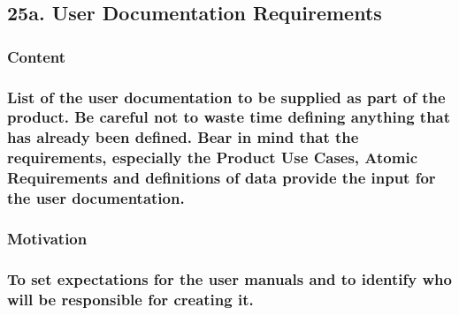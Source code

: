 \documentclass[
]{article}
\begin{document}
\hypertarget{a.-user-documentation-requirements}{%
\subsection{\texorpdfstring{25a. User Documentation Requirements
}{25a. User Documentation Requirements }}\label{a.-user-documentation-requirements}}

\hypertarget{content-74}{%
\subsubsection{Content}\label{content-74}}

\hypertarget{list-of-the-user-documentation-to-be-supplied-as-part-of-the-product.-be-careful-not-to-waste-time-defining-anything-that-has-already-been-defined.-bear-in-mind-that-the-requirements-especially-the-product-use-cases-atomic-requirements-and-definitions-of-data-provide-the-input-for-the-user-documentation.}{%
\subsubsection{\texorpdfstring{List of the user documentation to be
supplied as part of the product. Be careful not to waste time defining
anything that has already been defined. Bear in mind that the
requirements, especially the Product Use Cases, Atomic Requirements and
definitions of data provide the input for the user documentation.
}{List of the user documentation to be supplied as part of the product. Be careful not to waste time defining anything that has already been defined. Bear in mind that the requirements, especially the Product Use Cases, Atomic Requirements and definitions of data provide the input for the user documentation. }}\label{list-of-the-user-documentation-to-be-supplied-as-part-of-the-product.-be-careful-not-to-waste-time-defining-anything-that-has-already-been-defined.-bear-in-mind-that-the-requirements-especially-the-product-use-cases-atomic-requirements-and-definitions-of-data-provide-the-input-for-the-user-documentation.}}

\hypertarget{motivation-73}{%
\subsubsection{Motivation}\label{motivation-73}}

\hypertarget{to-set-expectations-for-the-user-manuals-and-to-identify-who-will-be-responsible-for-creating-it.}{%
\subsubsection{To set expectations for the user manuals and to identify
who will be responsible for creating
it.}\label{to-set-expectations-for-the-user-manuals-and-to-identify-who-will-be-responsible-for-creating-it.}}
\end{document}
